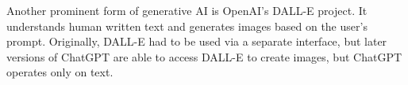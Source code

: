 Another prominent form of generative AI is OpenAI's DALL-E project. It understands human written text and generates images based on the user's prompt. Originally, DALL-E had to be used via a separate interface, but later versions of ChatGPT are able to access DALL-E to create images, but ChatGPT operates only on text.
